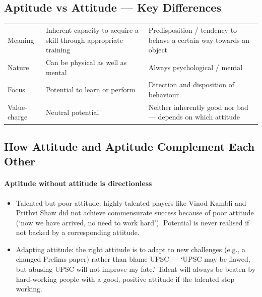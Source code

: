 \subsection{Aptitude vs Attitude --- Key Differences}

\begin{center}
\begin{tabularx}{\textwidth}{>{\raggedright\arraybackslash}p{2.4cm} Y Y}
 &  &  \\
\toprule
Meaning & Inherent capacity to acquire a skill through appropriate training & Predisposition / tendency to behave a certain way towards an object \\
Nature & Can be physical as well as mental & Always psychological / mental \\
Focus & Potential to learn or perform & Direction and disposition of behaviour \\
Value-charge & Neutral potential & Neither inherently good nor bad --- depends on which attitude \\
\bottomrule
\end{tabularx}
\end{center}

\subsection{How Attitude and Aptitude Complement Each Other}

\paragraph{Aptitude without attitude is directionless}
\begin{itemize}
\item Talented but poor attitude: highly talented players like Vinod Kambli and Prithvi Shaw did not achieve commensurate success because of poor attitude (`now we have arrived, no need to work hard'). Potential is never realised if not backed by a corresponding attitude.
\item Adapting attitude: the right attitude is to adapt to new challenges (e.g., a changed Prelims paper) rather than blame UPSC --- `UPSC may be flawed, but abusing UPSC will not improve my fate.' Talent will always be beaten by hard-working people with a good, positive attitude if the talented stop working.
\end{itemize}

